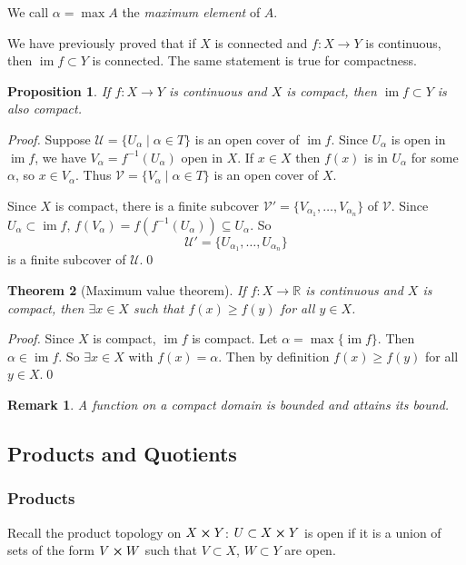 \documentclass{article}
\theoremstyle{plain}\theoremheaderfont{\normalfont\itshape}\theorembodyfont{\rmfamily}\theoremseparator{.}\newtheorem*{rem}{Remark}\newtheorem*{ex}{Example}\newtheorem*{proof}{Proof}\newtheorem*{altp}{Alternative proof}
\theoremstyle{plain}\theoremheaderfont{\normalfont\bfseries}\theorembodyfont{\rmfamily}\theoremseparator{.}\newtheorem{thm}{Theorem}[section]\newtheorem{lem}[thm]{Lemma}\newtheorem{prop}[thm]{Proposition}\newtheorem*{cor}{Corollary}\newtheorem{defn}[thm]{Definition}\newtheorem{clm}[thm]{Claim}\newtheorem{clminproof}{Claim}
\theoremstyle{break}\theoremheaderfont{\normalfont\itshape}\theorembodyfont{\rmfamily}\theoremseparator{.\medskip}\newtheorem*{proofskip}{Proof}\newtheorem*{exs}{Examples}\newtheorem*{rems}{Remarks}
\theoremstyle{break}\theoremheaderfont{\normalfont\bfseries}\theorembodyfont{\rmfamily}\theoremseparator{.\medskip}\newtheorem{lemskip}[thm]{Lemma}\newtheorem{defnskip}[thm]{Definition}\newtheorem{propskip}[thm]{Proposition}\newtheorem{thmskip}[thm]{Theorem}
\newcommand{\qed}{\hfill\ensuremath{\Box}}
\DeclareMathOperator{\im}{im}
\begin{document}
    We call \(\alpha=\max A\) the \textit{maximum element} of \(A\).

    We have previously proved that if \(X\) is connected and \(f:X\to Y\) is continuous, then \(\im f\subset Y\) is connected. The same statement is true for compactness.

    \begin{prop}
        If \(f:X\to Y\) is continuous and \(X\) is compact, then \(\im f\subset Y\) is also compact.
    \end{prop}
    \begin{proof}
        Suppose \(\mathscr{U}=\{U_\alpha\mid\alpha\in T\}\) is an open cover of \(\im f\). Since \(U_\alpha\) is open in \(\im f\), we have \(V_\alpha=f^{-1}(U_\alpha)\) open in \(X\). If \(x\in X\) then \(f(x)\) is in \(U_\alpha\) for some \(\alpha\), so \(x\in V_\alpha\). Thus \(\mathscr{V}=\{V_\alpha\mid\alpha\in T\}\) is an open cover of \(X\).

        Since \(X\) is compact, there is a finite subcover \(\mathscr{V}'=\{V_{\alpha_1},\dots,V_{\alpha_n}\}\) of \(\mathscr{V}\). Since \(U_\alpha\subset\im f\), \(f(V_\alpha)=f(f^{-1}(U_\alpha))\subseteq U_\alpha\). So
        \[\mathscr{U}'=\{U_{\alpha_1},\dots,U_{\alpha_n}\}\]
        is a finite subcover of \(\mathscr{U}\).\qed
    \end{proof}
    \begin{thm}[Maximum value theorem]
        If \(f:X\to\mathbb{R}\) is continuous and \(X\) is compact, then \(\exists x\in X\) such that \(f(x)\ge f(y)\) for all \(y\in X\).
    \end{thm}
    \begin{proof}
        Since \(X\) is compact, \(\im f\) is compact. Let \(\alpha=\max\{\im f\}\). Then \(\alpha\in\im f\). So \(\exists x\in X\) with \(f(x)=\alpha\). Then by definition \(f(x)\ge f(y)\) for all \(y\in X\).\qed
    \end{proof}
    \begin{rem}
        A function on a compact domain is bounded and attains its bound.
    \end{rem}
    \subsection{Products and Quotients}
    \subsubsection{Products}
    Recall the product topology on \(X\cross Y\): \(U\subset X\cross Y\) is open if it is a union of sets of the form \(V\cross W\) such that \(V\subset X\), \(W\subset Y\) are open.
\end{document}
